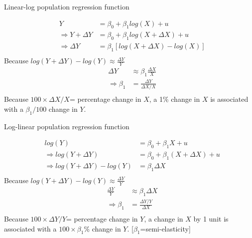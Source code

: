 \documentclass[notes,10pt, aspectratio=169]{beamer}
\begin{document}
\begin{frame}{Linear-log population regression function}

\begin{eqnarray*}
    & Y &= \beta_0 + \beta_1 log(X) + u\\
    & \Rightarrow Y + \Delta Y &= \beta_0 + \beta_1 log(X + \Delta X) + u\\
    &\Rightarrow  \Delta Y &=  \beta_1 [log(X + \Delta X)- log(X)]\\    
\end{eqnarray*}
Because $log(Y + \Delta Y) - log(Y) \approx \frac{\Delta Y}{Y}$
\begin{eqnarray*}
    &\Delta Y &\approx \beta_1  \frac{\Delta X}{X}  \\    
    &\Rightarrow  \beta_1  &=  \frac{\Delta Y}{\Delta X/X}\\    
\end{eqnarray*}
Because $100\times\Delta X/X$= percentage change in $X$, a 1\% change in $X$ is associated with a $\beta_1/100$ change in $Y$.
\end{frame}

\begin{frame}{Log-linear population regression function}

\begin{eqnarray*}
    & log(Y) &= \beta_0 + \beta_1 X + u\\
    & \Rightarrow log(Y + \Delta Y) &= \beta_0 + \beta_1 (X + \Delta X) + u\\
    &\Rightarrow  log(Y + \Delta Y)-log(Y) &=  \beta_1  \Delta X\\    
\end{eqnarray*}
Because $log(Y + \Delta Y) - log(Y) \approx \frac{\Delta Y}{Y}$
\begin{eqnarray*}
    &\frac{\Delta Y}{Y} &\approx \beta_1 \Delta X\\    
    &\Rightarrow  \beta_1  &=  \frac{\Delta Y/Y}{\Delta X}\\    
\end{eqnarray*}
Because $100\times\Delta Y/Y$= percentage change in $Y$, a change in $X$ by 1 unit is associated with a $100\times \beta_1$\% change in $Y$. \hfill[$\beta_1$=semi-elasticity]
\end{frame}
\end{document}

